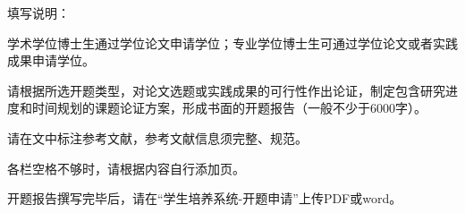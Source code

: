 \begingroup
\ProposalFang
\setlength{\parindent}{0pt}
\setlength{\parskip}{7.8bp}
填写说明：

学术学位博士生通过学位论文申请学位；专业学位博士生可通过学位论文或者实践成果申请学位。

请根据所选开题类型，对论文选题或实践成果的可行性作出论证，制定包含研究进度和时间规划的课题论证方案，形成书面的开题报告（一般不少于6000字）。

请在文中标注参考文献，参考文献信息须完整、规范。

各栏空格不够时，请根据内容自行添加页。

开题报告撰写完毕后，请在“学生培养系统-开题申请”上传PDF或word。
\par
\endgroup
\clearpage
